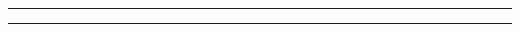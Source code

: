 \begin{solution}
        
            
\end{solution} 
    
\noindent\rule{7in}{1.5pt}
    


\begin{problem}{3.8}

\end{problem}
            
\begin{solution}
        
            
\end{solution} 
    
\noindent\rule{7in}{1.5pt}
    
